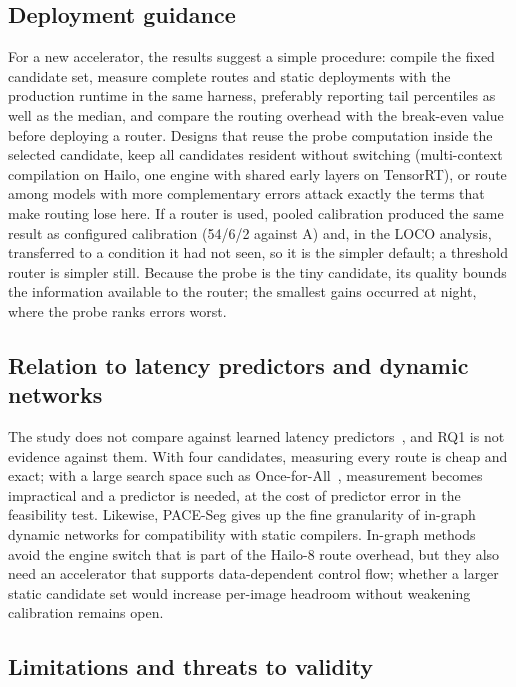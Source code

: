 \documentclass[a4paper,5p]{elsarticle}
\newcommand{\method}{PACE-Seg}
\begin{document}
\subsection{Deployment guidance}

For a new accelerator, the results suggest a simple procedure: compile the fixed candidate set, measure complete routes and static deployments with the production runtime in the same harness, preferably reporting tail percentiles as well as the median, and compare the routing overhead with the break-even value before deploying a router. Designs that reuse the probe computation inside the selected candidate, keep all candidates resident without switching (multi-context compilation on Hailo, one engine with shared early layers on TensorRT), or route among models with more complementary errors attack exactly the terms that make routing lose here. If a router is used, pooled calibration produced the same result as configured calibration (54/6/2 against A) and, in the LOCO analysis, transferred to a condition it had not seen, so it is the simpler default; a threshold router is simpler still. Because the probe is the tiny candidate, its quality bounds the information available to the router; the smallest gains occurred at night, where the probe ranks errors worst.

\subsection{Relation to latency predictors and dynamic networks}

The study does not compare against learned latency predictors~\cite{zhang2021nnmeter}, and RQ1 is not evidence against them. With four candidates, measuring every route is cheap and exact; with a large search space such as Once-for-All~\cite{cai2020ofa}, measurement becomes impractical and a predictor is needed, at the cost of predictor error in the feasibility test. Likewise, \method{} gives up the fine granularity of in-graph dynamic networks for compatibility with static compilers. In-graph methods avoid the engine switch that is part of the Hailo-8 route overhead, but they also need an accelerator that supports data-dependent control flow; whether a larger static candidate set would increase per-image headroom without weakening calibration remains open.

\subsection{Limitations and threats to validity}
\label{sec:limitations}
\end{document}
